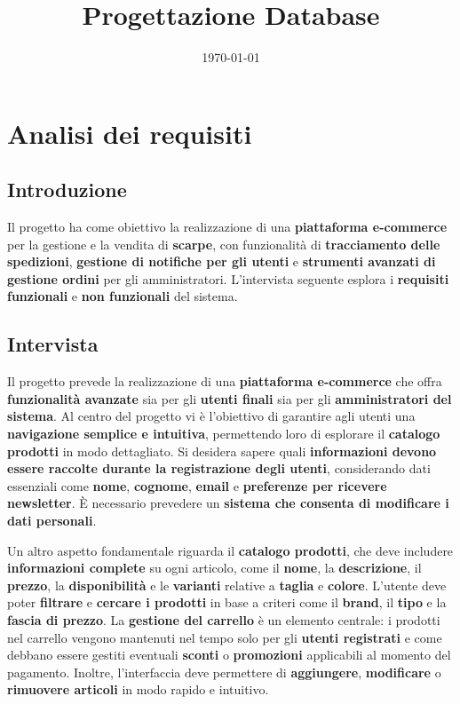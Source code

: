 \documentclass[a4paper,12pt]{report}
\title{\textbf{Progettazione Database}}
\date{\today}
\begin{document}
	\maketitle
	\tableofcontents
	\chapter{Analisi dei requisiti}
	\section{Introduzione}
	Il progetto ha come obiettivo la realizzazione di una \textbf{piattaforma e-commerce} per la gestione e la vendita di \textbf{scarpe}, con funzionalità di \textbf{tracciamento delle spedizioni}, \textbf{gestione di notifiche per gli utenti} e \textbf{strumenti avanzati di gestione ordini} per gli amministratori. L'intervista seguente esplora i \textbf{requisiti funzionali} e \textbf{non funzionali} del sistema.
	
	\section{Intervista}
	Il progetto prevede la realizzazione di una \textbf{piattaforma e-commerce} che offra \textbf{funzionalità avanzate} sia per gli \textbf{utenti finali} sia per gli \textbf{amministratori del sistema}. Al centro del progetto vi è l’obiettivo di garantire agli utenti una \textbf{navigazione semplice e intuitiva}, permettendo loro di esplorare il \textbf{catalogo prodotti} in modo dettagliato. Si desidera sapere quali \textbf{informazioni devono essere raccolte durante la registrazione degli utenti}, considerando dati essenziali come \textbf{nome}, \textbf{cognome}, \textbf{email} e \textbf{preferenze per ricevere newsletter}. È necessario prevedere un \textbf{sistema che consenta di modificare i dati personali}.
	
	Un altro aspetto fondamentale riguarda il \textbf{catalogo prodotti}, che deve includere \textbf{informazioni complete} su ogni articolo, come il \textbf{nome}, la \textbf{descrizione}, il \textbf{prezzo}, la \textbf{disponibilità} e le \textbf{varianti} relative a \textbf{taglia} e \textbf{colore}. L’utente deve poter \textbf{filtrare} e \textbf{cercare i prodotti} in base a criteri come il \textbf{brand}, il \textbf{tipo} e la \textbf{fascia di prezzo}. La \textbf{gestione del carrello} è un elemento centrale: i prodotti nel carrello vengono mantenuti nel tempo solo per gli \textbf{utenti registrati} e come debbano essere gestiti eventuali \textbf{sconti} o \textbf{promozioni} applicabili al momento del pagamento. Inoltre, l’interfaccia deve permettere di \textbf{aggiungere}, \textbf{modificare} o \textbf{rimuovere articoli} in modo rapido e intuitivo.
	
\end{document}
